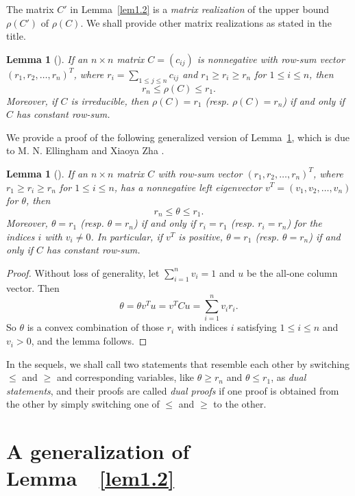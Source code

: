 \documentclass[final,3p, times, 12pt]{elsarticle}
\theoremstyle{plain}
\newtheorem{lem}[thm]{Lemma}
\theoremstyle{definition}
\theoremstyle{remark}
\numberwithin{equation}{section}
\begin{document}
The matrix $C'$ in Lemma~\ref{lem1.2} is a {\it matrix realization} of the upper bound $\rho(C')$ of $\rho(C)$. We shall provide other matrix realizations as stated in the title.



\begin{lem}[{\cite[Theorem 8.1.22]{Horn}}]\label{lem1.1}
If an $n\times n$ matrix $C=(c_{ij})$ is nonnegative with row-sum vector $(r_1,r_2,\ldots,r_n)^T$, where $r_i=\sum_{1\leq j\leq n}c_{ij}$ and $r_1\geq r_i\geq r_n$ for $1\leq i\leq n$,
then
$$r_n \leq \rho(C) \leq r_1.$$
Moreover, if $C$ is irreducible, then $\rho(C)=r_1$ (resp.  $\rho(C)=r_n$) if and only if $C$ has constant row-sum.
\end{lem}



We provide a proof of the following generalized version of Lemma~\ref{lem1.1}, which is due to  M. N. Ellingham and Xiaoya Zha \cite{ez}.

\begin{lem}[\cite{ez}]\label{lem1.1'}
If an $n\times n$ matrix $C$ with row-sum vector $(r_1,r_2,\ldots,r_n)^T$, where $r_1\geq r_i\geq r_n$ for $1\leq i\leq n$, has a nonnegative left eigenvector $v^T=(v_1,v_2,\ldots,v_n)$ for $\theta$, then
$$r_n \leq \theta \leq r_1.$$
Moreover, $\theta=r_1$ (resp. $\theta=r_n$) if and only if $r_i=r_1$ (resp. $r_i=r_n$) for the indices $i$ with $v_i\ne 0$.
In particular, if $v^T$ is positive, $\theta=r_1$ (resp. $\theta=r_n$) if and only if $C$ has constant row-sum.
\end{lem}
\begin{proof}
Without loss of generality, let $\sum_{i=1}^{n}v_i=1$ and $u$ be the all-one column vector. Then
$$\theta=\theta v^Tu=v^TCu=\sum_{i=1}^nv_ir_i.$$
So $\theta$ is a convex combination of those $r_i$ with indices $i$ satisfying $1\leq i\leq n$ and $v_i> 0$, and the lemma follows.
\end{proof}

In the sequels, we shall call two statements  that resemble each other by switching $\leq$ and $\geq$ and corresponding variables, like
$\theta\geq r_n$ and $\theta\leq r_1$, as {\it dual statements}, and  their proofs are called {\it dual proofs} if one proof is obtained from the other  by simply switching one of $\leq$ and $\geq$ to the other.





\section{A generalization of Lemma~~\ref{lem1.2}}\label{s2.2}
\end{document}
